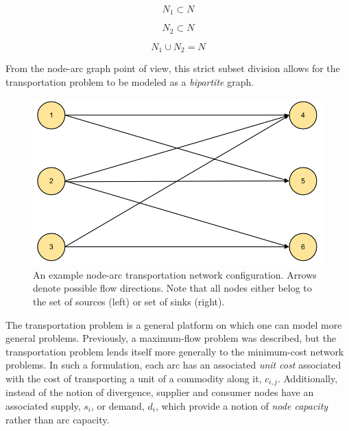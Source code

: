 \begin{equation}
  N_1 \subset N
\end{equation}

\begin{equation}
 N_2 \subset N
\end{equation}

\begin{equation}
  N_1 \cup N_2 = N
\end{equation}

From the node-arc graph point of view, this strict subset division allows for
the transportation problem to be modeled as a \textit{bipartite} graph.

\begin{figure}[H]
  \begin{center}
    \includegraphics[width=\linewidth]{./chapters/litreview/node-arcs-bipartite.png}
  \caption{An example node-arc transportation network configuration. Arrows
    denote possible flow directions. Note that all nodes either belog to the set
    of sources (left) or set of sinks (right).}
  \label{fig:node-arcs-bipartite}
  \end{center}
\end{figure}

The transportation problem is a general platform on which one can model more
general problems. Previously, a maximum-flow problem was described, but the
transportation problem lends itself more generally to the minimum-cost network
problems. In such a formulation, each arc has an associated \textit{unit cost}
associated with the cost of transporting a unit of a commodity along it,
$c_{i,j}$. Additionally, instead of the notion of divergence, supplier and
consumer nodes have an associated supply, $s_i$, or demand, $d_i$, which provide
a notion of \textit{node capacity} rather than arc capacity.

